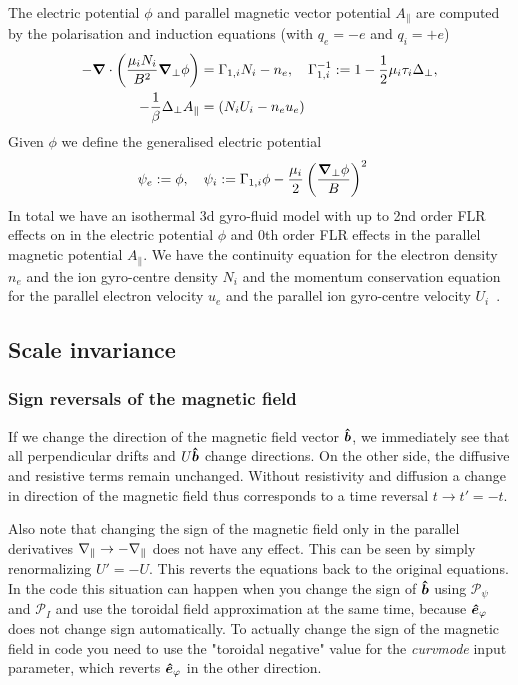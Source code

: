 The electric potential \(\phi\) and parallel magnetic vector potential \(A_\parallel\) are
computed by the polarisation and induction equations (with $q_e=-e$ and $q_i=+e$)
\begin{align}
 -{\boldsymbol{\nabla}}\cdot\left(\frac{\mu_iN_i}{B^2} {\boldsymbol{\nabla}}_{\perp} \phi\right) &=  \Gamma_{1,i} N_i -n_e, \quad \Gamma_{1,i}^{-1} := 1-\frac{1}{2}\mu_i\tau_i\Delta_\perp , \\
  -\frac{1}{\beta} \Delta_\perp A_\parallel &= \left(N_i U_i-n_e u_e \right)
  \label{eq:polarisation_dimensional}
\end{align}
Given $\phi$ we define the generalised electric potential
\begin{align}
    \psi_e := \phi,\quad \psi_i&:= \Gamma_{1,i} \phi - \frac{\mu_i }{2}\left(\frac{{\boldsymbol{\nabla}}_{\perp}\phi}{B}\right)^2
\end{align}
In total
we have an isothermal 3d gyro-fluid model with up to 2nd order FLR effects
on in the electric potential $\phi$ and 0th order FLR effects in the parallel magnetic
potential $A_\parallel$.
We have the continuity equation for the electron density \(n_e\) and the ion gyro-centre
density \(N_i\) and the momentum conservation equation for
the parallel electron velocity \(u_e\) and the parallel ion gyro-centre velocity \(U_i\)~\cite{WiesenbergerPhD, HeldPhD}.
\subsection{ Scale invariance}
\subsubsection{Sign reversals of the magnetic field}\label{sec:field_reversal}
If we change the direction of the magnetic field vector $\bm{\hat{b}}$, we immediately see that all perpendicular
drifts and $U\bm{\hat{b}}$ change directions. On the other side, the diffusive and resistive terms remain unchanged.
Without resistivity and diffusion a change in direction of the magnetic field thus corresponds to
a time reversal $t\rightarrow t'=-t$.

Also note that changing the sign of the magnetic field only in the parallel derivatives $\nabla_\parallel \rightarrow -\nabla_\parallel$ does not
have any effect. This can be seen by simply renormalizing $U'=-U$. This reverts the equations back to the original equations.
In the code this situation can happen when you change the sign of $\bm{\hat{b}}$ using $\mathcal P_\psi$  and $\mathcal P_I$
and use the toroidal field approximation at the same time, because $\bm{\hat{e}}_\varphi$
does not change sign automatically.
To actually change the sign of the magnetic field in code you need to use the "toroidal
negative" value for the \textit{curvmode} input parameter, which reverts $\bm{\hat{e}}_\varphi$ in the other direction.
